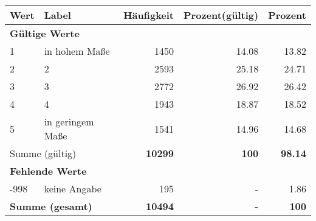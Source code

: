      \begin{longtable}{lXrrr}
     \toprule
     \textbf{Wert} & \textbf{Label} & \textbf{Häufigkeit} & \textbf{Prozent(gültig)} & \textbf{Prozent} \\
     \endhead
     \midrule
     \multicolumn{5}{l}{\textbf{Gültige Werte}}\\

     1 &
     \multicolumn{1}{X}{ in hohem Maße   } &


       \num{1450} &
       \num[round-mode=places,round-precision=2]{14.08} &
         \num[round-mode=places,round-precision=2]{13.82} \\

     2 &
     \multicolumn{1}{X}{ 2   } &


       \num{2593} &
       \num[round-mode=places,round-precision=2]{25.18} &
         \num[round-mode=places,round-precision=2]{24.71} \\

     3 &
     \multicolumn{1}{X}{ 3   } &


       \num{2772} &
       \num[round-mode=places,round-precision=2]{26.92} &
         \num[round-mode=places,round-precision=2]{26.42} \\

     4 &
     \multicolumn{1}{X}{ 4   } &


       \num{1943} &
       \num[round-mode=places,round-precision=2]{18.87} &
         \num[round-mode=places,round-precision=2]{18.52} \\

     5 &
     \multicolumn{1}{X}{ in geringem Maße   } &


       \num{1541} &
       \num[round-mode=places,round-precision=2]{14.96} &
         \num[round-mode=places,round-precision=2]{14.68} \\
     \midrule
     \multicolumn{2}{l}{Summe (gültig)} &
       \textbf{\num{10299}} &
     \textbf{\num{100}} &
       \textbf{\num[round-mode=places,round-precision=2]{98.14}} \\
     \multicolumn{5}{l}{\textbf{Fehlende Werte}}\\
       -998 &
       keine Angabe &
         \num{195} &
        - &
         \num[round-mode=places,round-precision=2]{1.86} \\
     \midrule
     \multicolumn{2}{l}{\textbf{Summe (gesamt)}} &
          \textbf{\num{10494}} &
        \textbf{-} &
        \textbf{\num{100}} \\
     \bottomrule
     \end{longtable}
     
